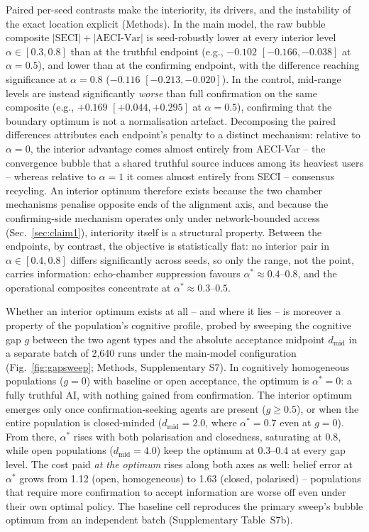 \documentclass[pdflatex,sn-nature]{sn-jnl}
\begin{document}
Paired per-seed contrasts make the interiority, its drivers, and the instability of the exact location explicit (Methods). In the main model, the raw bubble composite $|\text{SECI}| + |\text{AECI-Var}|$ is seed-robustly lower at every interior level $\alpha \in [0.3, 0.8]$ than at the truthful endpoint (e.g., $-0.102$ $[-0.166, -0.038]$ at $\alpha = 0.5$), and lower than at the confirming endpoint, with the difference reaching significance at $\alpha = 0.8$ ($-0.116$ $[-0.213, -0.020]$). In the control, mid-range levels are instead significantly \emph{worse} than full confirmation on the same composite (e.g., $+0.169$ $[+0.044, +0.295]$ at $\alpha = 0.5$), confirming that the boundary optimum is not a normalisation artefact. Decomposing the paired differences attributes each endpoint's penalty to a distinct mechanism: relative to $\alpha = 0$, the interior advantage comes almost entirely from AECI-Var -- the convergence bubble that a shared truthful source induces among its heaviest users -- whereas relative to $\alpha = 1$ it comes almost entirely from SECI -- consensus recycling. An interior optimum therefore exists because the two chamber mechanisms penalise opposite ends of the alignment axis, and because the confirming-side mechanism operates only under network-bounded access (Sec.~\ref{sec:claim1}), interiority itself is a structural property. Between the endpoints, by contrast, the objective is statistically flat: no interior pair in $\alpha \in [0.4, 0.8]$ differs significantly across seeds, so only the range, not the point, carries information: echo-chamber suppression favours $\alpha^{*} \approx 0.4$--$0.8$, and the operational composites concentrate at $\alpha^{*} \approx 0.3$--$0.5$.

Whether an interior optimum exists at all -- and where it lies -- is moreover a property of the population's cognitive profile, probed by sweeping the cognitive gap $g$ between the two agent types and the absolute acceptance midpoint $d_{\text{mid}}$ in a separate batch of 2{,}640 runs under the main-model configuration (Fig.~\ref{fig:gapsweep}; Methods, Supplementary S7). In cognitively homogeneous populations ($g = 0$) with baseline or open acceptance, the optimum is $\alpha^{*} = 0$: a fully truthful AI, with nothing gained from confirmation. The interior optimum emerges only once confirmation-seeking agents are present ($g \geq 0.5$), or when the entire population is closed-minded ($d_{\text{mid}} = 2.0$, where $\alpha^{*} = 0.7$ even at $g = 0$). From there, $\alpha^{*}$ rises with both polarisation and closedness, saturating at 0.8, while open populations ($d_{\text{mid}} = 4.0$) keep the optimum at 0.3--0.4 at every gap level. The cost paid \emph{at the optimum} rises along both axes as well: belief error at $\alpha^{*}$ grows from 1.12 (open, homogeneous) to 1.63 (closed, polarised) -- populations that require more confirmation to accept information are worse off even under their own optimal policy. The baseline cell reproduces the primary sweep's bubble optimum from an independent batch (Supplementary Table~S7b).
\end{document}
